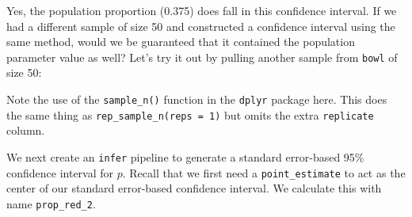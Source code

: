 \documentclass[12pt, krantz2,]{krantz}
\makeatletter
\newenvironment{Shaded}{\begin{snugshade}}{\end{snugshade}}
\newcommand{\DataTypeTok}[1]{\textcolor[rgb]{0.27,0.27,0.27}{#1}}
\newcommand{\DecValTok}[1]{\textcolor[rgb]{0.06,0.06,0.06}{#1}}
\newcommand{\KeywordTok}[1]{\textcolor[rgb]{0.27,0.27,0.27}{\textbf{#1}}}
\newcommand{\NormalTok}[1]{#1}
\newcommand{\OperatorTok}[1]{\textcolor[rgb]{0.43,0.43,0.43}{\textbf{#1}}}
\newcommand{\OtherTok}[1]{\textcolor[rgb]{0.37,0.37,0.37}{#1}}
\newcommand{\StringTok}[1]{\textcolor[rgb]{0.5,0.5,0.5}{#1}}
\newenvironment{kframe}{%
\medskip{}
\setlength{\fboxsep}{.8em}
 \def\at@end@of@kframe{}%
 \ifinner\ifhmode%
  \def\at@end@of@kframe{\end{minipage}}%
  \begin{minipage}{\columnwidth}%
 \fi\fi%
 \def\FrameCommand##1{\hskip\@totalleftmargin \hskip-\fboxsep
 \colorbox{shadecolor}{##1}\hskip-\fboxsep
     \hskip-\linewidth \hskip-\@totalleftmargin \hskip\columnwidth}%
 \MakeFramed {\advance\hsize-\width
   \@totalleftmargin\z@ \linewidth\hsize
   \@setminipage}}%
 {\par\unskip\endMakeFramed%
 \at@end@of@kframe}
\renewenvironment{Shaded}{\begin{kframe}}{\end{kframe}}
\makeatother
\begin{document}
Yes, the population proportion (0.375) does fall in this confidence interval. If we had a different sample of size 50 and constructed a confidence interval using the same method, would we be guaranteed that it contained the population parameter value as well? Let's try it out by pulling another sample from \texttt{bowl} of size 50:

\begin{Shaded}
\end{Shaded}

Note the use of the \texttt{sample\_n()} function in the \texttt{dplyr} package here. This does the same thing as \texttt{rep\_sample\_n(reps\ =\ 1)} but omits the extra \texttt{replicate} column.

We next create an \texttt{infer} pipeline to generate a standard error-based 95\% confidence interval for \(p\). Recall that we first need a \texttt{point\_estimate} to act as the center of our standard error-based confidence interval. We calculate this with name \texttt{prop\_red\_2}.

\begin{Shaded}
\end{Shaded}
\end{document}
